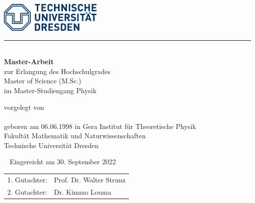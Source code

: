 \makeatletter
\thispagestyle{empty}
\begin{titlepage}
  \includegraphics[width=5cm]{figs/logo.pdf}
  \vspace{1em}
  \hrule

  {\centering
  \vspace*{5em}
  {\bfseries\Huge \@title\\}
    \vfill \vfill
    {\large {\bfseries Master-Arbeit} \\
      zur Erlangung des Hochschulgrades\\
      Master of Science (M.Sc.)\\
      im Master-Studiengang Physik}

    \vfill
      {vorgelegt von\\
      {\large \@author}\\
      geboren am 06.06.1998 in Gera}
  \vfill
  {\large Institut f\"ur Theoretische Physik\\
    Fakultät Mathematik und Naturwissenschaften\\
    Technische Universität Dresden \\}
}

\newpage \thispagestyle{empty}\ \newpage
\clearpage
\thispagestyle{empty}
\null\vfill
{\large Eingereicht am 30. September 2022}

\begin{tabular*}{.5\linewidth}[h]{ll}
  1. Gutachter: & Prof. Dr. Walter Strunz \\
  2. Gutachter: & Dr. Kimmo Louma \\
\end{tabular*}
\end{titlepage}
\makeatother
